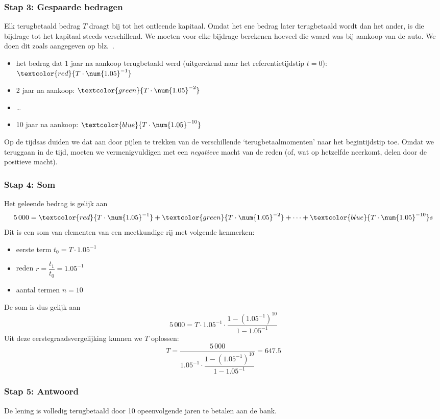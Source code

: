 \subsubsection{Stap 3: Gespaarde bedragen}
     Elk terugbetaald bedrag $T$ draagt bij tot het ontleende kapitaal. Omdat het ene bedrag later terugbetaald wordt dan het ander, is die bijdrage tot het kapitaal steeds verschillend. We moeten voor elke bijdrage berekenen hoeveel die waard was bij aankoop van de auto. We doen dit zoals aangegeven op blz.~\pageref{vb1:2demanier}.
     \begin{itemize}
\item het bedrag dat 1 jaar na aankoop terugbetaald werd (uitgerekend naar het referentietijdstip $t=0$): $\textcolor{red}{T\cdot \num{1.05}^{-1}}$
\item 2 jaar na aankoop: $\textcolor{green}{T\cdot \num{1.05}^{-2}}$
\item \dots
\item 10 jaar na aankoop: $\textcolor{blue}{T\cdot \num{1.05}^{-10}}$
\end{itemize}
Op de tijdsas duiden we dat aan door pijlen te trekken van de verschillende `terugbetaalmomenten' naar het begintijdstip toe. Omdat we teruggaan in de tijd, moeten we vermenigvuldigen met een \emph{negatieve} macht van de reden (of, wat op hetzelfde neerkomt, delen door de positieve macht).

\subsubsection{Stap 4: Som}
Het geleende bedrag is gelijk aan
\begin{equation}
5\,000=\textcolor{red}{T\cdot \num{1.05}^{-1}}+\textcolor{green}{T\cdot \num{1.05}^{-2}}+\dots+\textcolor{blue}{T\cdot \num{1.05}^{-10}}s
\end{equation}
Dit is een som van elementen van een meetkundige rij met volgende kenmerken:
\begin{itemize}
\item eerste term $t_0=T\cdot \num{1.05}^{-1}$
\item reden $r=\dfrac{t_1}{t_0}=\num{1.05}^{-1}$
\item aantal termen $n=10$
\end{itemize}
De som is dus gelijk aan
\begin{equation}
5\,000=T\cdot \num{1.05}^{-1}\cdot \frac{1-\left(\num{1.05}^{-1}\right)^{10}}{1-\num{1.05}^{-1}}
\end{equation}
Uit deze eerstegraadsvergelijking kunnen we $T$ oplossen:
\begin{equation}
T=\frac{5\,000}{ \num{1.05}^{-1}\cdot \dfrac{1-\left(\num{1.05}^{-1}\right)^{10}}{1-\num{1.05}^{-1}}}=\num{647.5}
\end{equation}

\subsubsection{Stap 5: Antwoord}
De lening is volledig terugbetaald
    door 10 opeenvolgende jaren  te betalen aan de bank.


